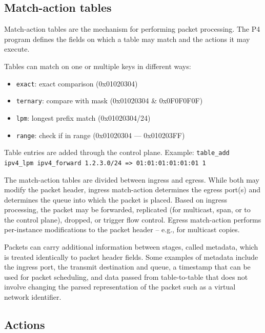 \documentclass[11pt,oneside,a4paper]{article}
\begin{document}
\subsection{Match-action tables}

Match-action tables are the mechanism for performing packet processing. The P4 program defines the fields on which a table may match and the actions it may execute.

\noindent Tables can match on one or multiple keys in different ways:
\vspace{-\topsep}
\begin{itemize}
	\setlength{\itemsep}{0pt}
	\setlength{\parskip}{0pt}
	\item \texttt{exact}: exact comparison (0x01020304)
	\item \texttt{ternary}: compare with mask (0x01020304 \& 0x0F0F0F0F)
	\item \texttt{lpm}: longest prefix match (0x01020304/24)
	\item \texttt{range}: check if in range	(0x01020304 — 0x010203FF)
\end{itemize}
\vspace{-\topsep}

\noindent Table entries are added through the control plane.\newline
Example: \texttt{table\_add ipv4\_lpm ipv4\_forward 1.2.3.0/24 => 01:01:01:01:01:01 1}

The match-action tables are divided between ingress and egress. While both may modify the packet header, ingress match-action determines the egress port(s) and determines the queue into which the packet is placed. Based on ingress processing, the packet may be forwarded, replicated (for multicast, span, or to the control plane), dropped, or trigger flow control. Egress match-action performs per-instance modifications to the packet header – e.g., for multicast copies.

Packets can carry additional information between stages, called metadata, which is treated identically to packet header fields. Some examples of metadata include the ingress port, the transmit destination and queue, a timestamp that can be used for packet scheduling, and data passed from table-to-table that does not involve changing the parsed representation of the packet such as a virtual network identifier.

\subsection{Actions}
\end{document}
